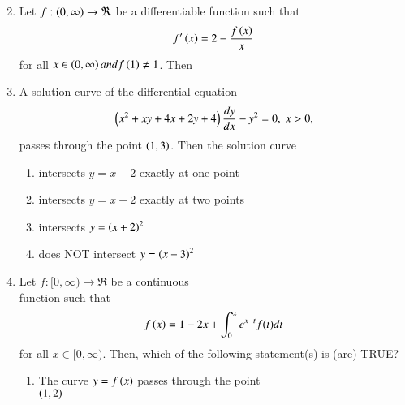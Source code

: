 \documentclass[journal,12pt,twocolumn,article]{IEEEtran}
\theoremstyle{remark}
\begin{document}
\begin{enumerate}[start = 6]
\begin{enumerate}
\begin{multicols}{2}
\end{multicols}
\end{enumerate}
\item Let $f:\left(0,\infty\right) \rightarrow \Re$ be a differentiable function such that 
\begin{align*}
f'\left(x\right) = 2-\frac{f\left(x\right)}{x}
\end{align*} for all $x \in \left(0,\infty\right) and f\left(1\right) \neq 1$. Then
\hfill{}
\begin{enumerate}
\end{enumerate}
\item A solution curve of the differential equation 
\begin{align*}
\left(x^2+xy+4x+2y+4\right)\frac{dy}{dx}-y^2=0,\;x>0,
\end{align*} passes through the point $\left(1,3\right)$. Then the solution curve
\hfill{}
\begin{enumerate}
\item intersects $y=x+2$ exactly at one point
\item intersects $y=x+2$ exactly at two points
\item intersects $y=\left(x+2\right)^2$ 
\item does NOT intersect $y=\left(x+3\right)^2$
\end{enumerate}
\item Let $f:[0,\infty)\rightarrow \Re$ be a continuous \\function such that
\begin{align*}
f\left(x\right) = 1-2x+ \int_0^x e^{x-t} f(t) dt
\end{align*} for all $x\in[0,\infty)$. Then, which of the following statement(s) is (are) TRUE?
\hfill{}
\begin{enumerate}
\item The curve $y=f\left(x\right)$ passes through the point \\$\left(1,2\right)$

\end{enumerate}
\end{enumerate}
\end{document}
